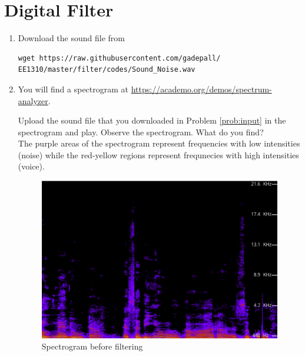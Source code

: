\documentclass[journal,12pt,twocolumn]{IEEEtran}
\theoremstyle{remark}
\renewcommand\thesection{\arabic{section}}
\numberwithin{equation}{subsection}
\begin{document}
\section{Digital Filter}
\begin{enumerate}[label=\thesection.\arabic*
,ref=\thesection.\theenumi]
\item
\label{prob:input}
Download the sound file from  
\begin{lstlisting}
wget https://raw.githubusercontent.com/gadepall/ 
EE1310/master/filter/codes/Sound_Noise.wav
\end{lstlisting}
\item
\label{prob:spectrogram}
You will find a spectrogram at \href{https://academo.org/demos/spectrum-analyzer}{\url{https://academo.org/demos/spectrum-analyzer}}. 

Upload the sound file that you downloaded in Problem \ref{prob:input} in the spectrogram  and play.  Observe the spectrogram. What do you find?
\\

\solution The purple areas of the spectrogram represent frequencies with low intensities (noise) while the red-yellow regions represent frequnecies with high intensities (voice). 

\begin{figure}[!h]
    \centering
    \includegraphics[width = \columnwidth]{figs/unfiltered.png}
    \caption{Spectrogram before filtering}
    \label{fig:2.2}
\end{figure}


\end{enumerate}
\end{document}
